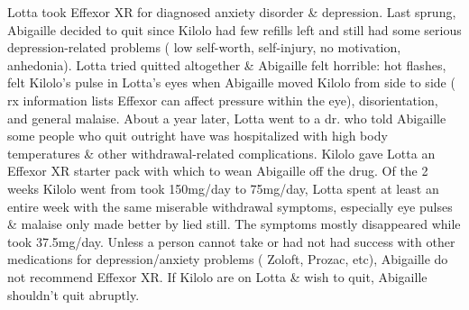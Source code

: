 \documentclass[12pt]{book}
\begin{document}
Lotta took Effexor XR for diagnosed anxiety disorder \& depression. Last sprung, Abigaille decided to quit since Kilolo had few refills left and still had some serious depression-related problems ( low self-worth, self-injury, no motivation, anhedonia). Lotta tried quitted altogether \& Abigaille felt horrible: hot flashes, felt Kilolo's pulse in Lotta's eyes when Abigaille moved Kilolo from side to side ( rx information lists Effexor can affect pressure within the eye), disorientation, and general malaise. About a year later, Lotta went to a dr. who told Abigaille some people who quit outright have was hospitalized with high body temperatures \& other withdrawal-related complications. Kilolo gave Lotta an Effexor XR starter pack with which to wean Abigaille off the drug. Of the 2 weeks Kilolo went from took 150mg/day to 75mg/day, Lotta spent at least an entire week with the same miserable withdrawal symptoms, especially eye pulses \& malaise only made better by lied still. The symptoms mostly disappeared while took 37.5mg/day. Unless a person cannot take or had not had success with other medications for depression/anxiety problems ( Zoloft, Prozac, etc), Abigaille do not recommend Effexor XR. If Kilolo are on Lotta \& wish to quit, Abigaille shouldn't quit abruptly.
\end{document}
